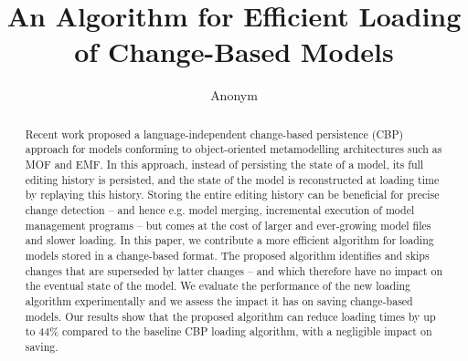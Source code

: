 \documentclass{llncs}
\begin{document}
\renewcommand{\thelstlisting}{\arabic{lstlisting}}
\renewcommand{\labelitemi}{$\bullet$}
\newcommand{\dk}[1]{\textbf{[DK: #1]}}

\title{An Algorithm for Efficient Loading \\ of Change-Based Models}
%
%
\author{
    Anonym%
}
%
%
%


\maketitle              %
\begin{abstract}

Recent work proposed a language-independent change-based persistence (CBP) approach for models conforming to object-oriented metamodelling architectures such as MOF and EMF. In this approach, instead of persisting the state of a model, its full editing history is persisted, and the state of the model is reconstructed at loading time by replaying this history. Storing the entire editing history can be beneficial for precise change detection -- and hence e.g. model merging, incremental execution of model management programs -- but comes at the cost of larger and ever-growing model files and slower loading. In this paper, we contribute a more efficient algorithm for loading models stored in a change-based format. The proposed algorithm identifies and skips changes that are superseded by latter changes -- and which therefore have no impact on the eventual state of the model. We evaluate the performance of the new loading algorithm experimentally and we assess the impact it has on saving change-based models. Our results show that the proposed algorithm can reduce loading times by up to 44\% compared to the baseline CBP loading algorithm, with a negligible impact on saving.

\end{abstract}
\end{document}
